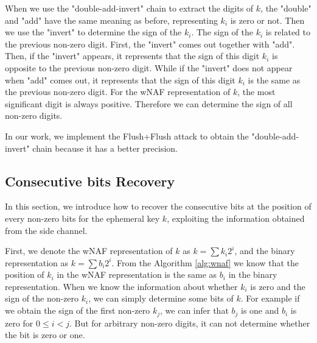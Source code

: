 
When we use the "double-add-invert" chain to extract the digits of $k$, 
 the "double" and "add" have the same meaning as before, representing $k_i$ is zero or not. 
 Then we use the "invert" to determine the sign of the $k_i$.
The sign of the $k_i$ is related to the previous non-zero digit.
First, the "invert" comes out together with "add".
 Then, if the "invert" appears, it represents that the sign of this digit $k_i$ is opposite to the previous non-zero digit.
 While if the "invert" does not appear when "add" comes out, it represents that 
the sign of this digit $k_i$ is the same as the previous non-zero digit.
 For the wNAF representation of $k$, the most significant digit is always positive. 
 Therefore we can determine the sign of all non-zero digits.
 
 In our work, we implement the Flush+Flush attack to obtain the "double-add-invert" chain because it has a better precision.







\subsection{Consecutive bits Recovery}
\label{data_proc1}
In this section, we introduce how to recover the consecutive bits at the position of every non-zero bits for the ephemeral key $k$, exploiting the information obtained from the side channel.

First, we denote the wNAF representation of $k$ as $k = \sum{k_{i}2^{i}}$,
 and the binary representation as $k = \sum{b_{i}2^{i}}$.
From the Algorithm \ref{alg:wnaf} we know that the position of $k_i$ in the wNAF representation is the same as $b_i$ in the binary representation.
 When we know the information about whether $k_i$ is zero and the sign of the non-zero $k_i$, we can simply determine some bits of $k$.
 For example if we obtain the sign of the first non-zero $k_j$, we can infer that $b_j$ is one and $b_i$ is zero for $0\leq i<j$.
 But for arbitrary non-zero digits, it can not determine whether the bit is zero or one.
 
